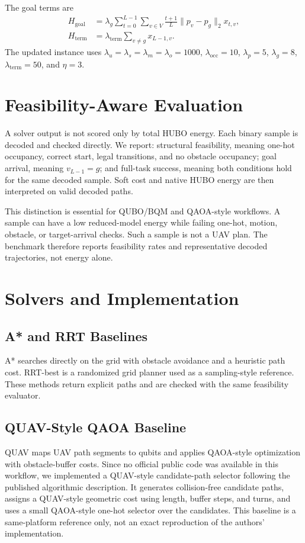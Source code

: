 \documentclass[10pt,conference]{IEEEtran}
\begin{document}
The goal terms are
\begin{align}
H_{\mathrm{goal}} &= \lambda_g\sum_{t=0}^{L-1}\sum_{v\in V}\frac{t+1}{L}\|p_v-p_g\|_2x_{t,v},\\
H_{\mathrm{term}} &= \lambda_{\mathrm{term}}\sum_{v\ne g}x_{L-1,v}.
\end{align}
The updated instance uses $\lambda_u=\lambda_s=\lambda_m=\lambda_o=1000$, $\lambda_{\mathrm{occ}}=10$, $\lambda_p=5$, $\lambda_g=8$, $\lambda_{\mathrm{term}}=50$, and $\eta=3$.

\section{Feasibility-Aware Evaluation}
A solver output is not scored only by total HUBO energy. Each binary sample is decoded and checked directly. We report: structural feasibility, meaning one-hot occupancy, correct start, legal transitions, and no obstacle occupancy; goal arrival, meaning $v_{L-1}=g$; and full-task success, meaning both conditions hold for the same decoded sample. Soft cost and native HUBO energy are then interpreted on valid decoded paths.

This distinction is essential for QUBO/BQM and QAOA-style workflows. A sample can have a low reduced-model energy while failing one-hot, motion, obstacle, or target-arrival checks. Such a sample is not a UAV plan. The benchmark therefore reports feasibility rates and representative decoded trajectories, not energy alone.

\section{Solvers and Implementation}
\subsection{A* and RRT Baselines}
A* searches directly on the grid with obstacle avoidance and a heuristic path cost. RRT-best is a randomized grid planner used as a sampling-style reference. These methods return explicit paths and are checked with the same feasibility evaluator.

\subsection{QUAV-Style QAOA Baseline}
QUAV maps UAV path segments to qubits and applies QAOA-style optimization with obstacle-buffer costs. Since no official public code was available in this workflow, we implemented a QUAV-style candidate-path selector following the published algorithmic description. It generates collision-free candidate paths, assigns a QUAV-style geometric cost using length, buffer steps, and turns, and uses a small QAOA-style one-hot selector over the candidates. This baseline is a same-platform reference only, not an exact reproduction of the authors' implementation.
\end{document}
